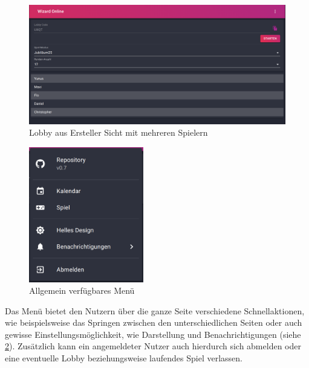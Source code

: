 \begin{figure}[h]
	\includegraphics[width=\textwidth]{images/lobby.png}
	\caption{Lobby aus Ersteller Sicht mit mehreren Spielern}
	\label{fig:lobby}
\end{figure}

\begin{figure}
	\includegraphics[width=5cm]{images/menu.png}
	\caption{Allgemein verfügbares Menü}
	\label{fig:menu}
\end{figure}

Das Menü bietet den Nutzern über die ganze Seite verschiedene Schnellaktionen, wie beispielsweise das Springen zwischen den unterschiedlichen Seiten oder auch gewisse Einstellungsmöglichkeit, wie Darstellung und Benachrichtigungen (siehe \cref{fig:menu}). Zusätzlich kann ein angemeldeter Nutzer auch hierdurch sich abmelden oder eine eventuelle Lobby beziehungsweise laufendes Spiel verlassen.

